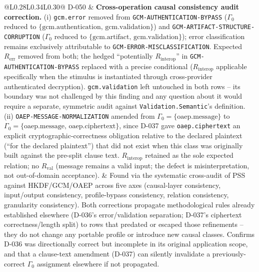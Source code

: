 \documentclass[11pt,a4paper]{article}
\begin{document}
\begin{longtable}{@{}L{0.28\textwidth}L{0.34\textwidth}L{0.30\textwidth}@{}}
D-050 & \textbf{Cross-operation causal consistency audit correction.} (i) \texttt{gcm.error} removed from \texttt{GCM-AUTHENTICATION-BYPASS} ($\Gamma_0$ reduced to $\{\text{gcm.authentication, gcm.validation}\}$) and \texttt{GCM-ARTIFACT-STRUCTURE-CORRUPTION} ($\Gamma_0$ reduced to $\{\text{gcm.artifact, gcm.validation}\}$); error classification remains exclusively attributable to \texttt{GCM-ERROR-MISCLASSIFICATION}. Expected $R_{\text{err}}$ removed from both; the hedged ``potentially $R_{\text{interop}}$'' in \texttt{GCM-AUTHENTICATION-BYPASS} replaced with a precise conditional (\texttt{$R_{\text{interop}}$} applicable specifically when the stimulus is instantiated through cross-provider authenticated decryption). \texttt{gcm.validation} left untouched in both rows -- its boundary was not challenged by this finding and any question about it would require a separate, symmetric audit against \texttt{Validation.Semantic}'s definition. (ii) \texttt{OAEP-MESSAGE-NORMALIZATION} amended from $\Gamma_0=\{\text{oaep.message}\}$ to $\Gamma_0=\{\text{oaep.message, oaep.ciphertext}\}$, since D-037 gave \texttt{oaep.ciphertext} an explicit cryptographic-correctness obligation relative to the declared plaintext (``for the declared plaintext'') that did not exist when this class was originally built against the pre-split clause text. $R_{\text{interop}}$ retained as the sole expected relation; no $R_{\text{val}}$ (message remains a valid input; the defect is misinterpretation, not out-of-domain acceptance). & Found via the systematic cross-audit of PSS against HKDF/GCM/OAEP across five axes (causal-layer consistency, input/output consistency, profile-bypass consistency, relation consistency, granularity consistency). Both corrections propagate methodological rules already established elsewhere (D-036's error/validation separation; D-037's ciphertext correctness/length split) to rows that predated or escaped those refinements -- they do not change any portable profile or introduce new causal classes. Confirms D-036 was directionally correct but incomplete in its original application scope, and that a clause-text amendment (D-037) can silently invalidate a previously-correct $\Gamma_0$ assignment elsewhere if not propagated.\\

\end{longtable}
\end{document}
